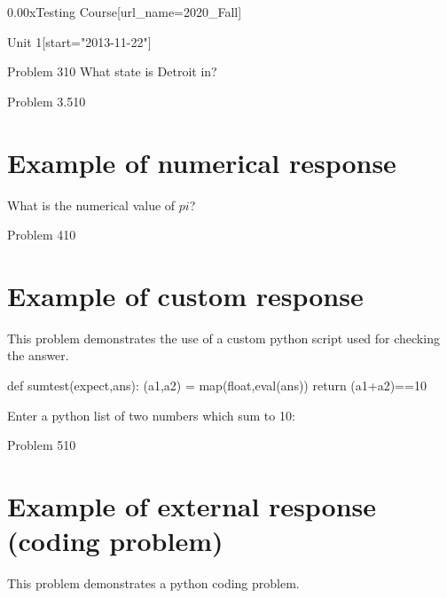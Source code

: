 \documentclass[12pt]{article}
\begin{document}
\begin{edXcourse}{0.00x}{Testing Course}[url_name=2020_Fall]
\begin{edXchapter}{Unit 1}[start="2013-11-22"]
\begin{edXproblem}{Problem 3}{10}
What state is Detroit in?


\end{edXproblem}


\begin{edXproblem}{Problem 3.5}{10}

\section{Example of numerical response}  

What is the numerical value of $pi$?


\end{edXproblem}


\begin{edXproblem}{Problem 4}{10}

\section{Example of custom response}  

This problem demonstrates the use of a custom python script used for
checking the answer.

\begin{edXscript}
def sumtest(expect,ans):
    (a1,a2) = map(float,eval(ans))
    return (a1+a2)==10
\end{edXscript}

Enter a python list of two numbers which sum to 10:


\end{edXproblem}


\begin{edXproblem}{Problem 5}{10}

\section{Example of external response (coding problem)}  

This problem demonstrates a python coding problem.


\end{edXproblem}
\end{edXchapter}
\end{edXcourse}
\end{document}
